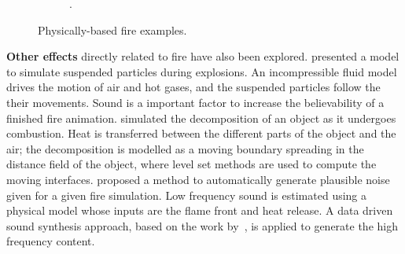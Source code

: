 \begin{figure}[htpb!]
\begin{subfigure}[t]{0.3\textwidth}
                \caption{\cite{Hong:2007}.}
        \end{subfigure} 
        \caption{Physically-based fire examples.}
        \label{fig:physically_based}
\end{figure}
 
\textbf{Other effects} directly related to fire have also been explored.
\cite{Feldman:2003} presented a model to simulate suspended particles during explosions.
An incompressible fluid model drives the motion of air and hot gases, and the suspended particles follow the their movements.
Sound is a important factor to increase the believability of a finished fire animation.
\cite{Melek:2005} simulated the decomposition of an object as it undergoes combustion.
Heat is transferred between the different parts of the object and the air; the decomposition is modelled as a moving boundary spreading in the distance field of the object, where level set methods are used to compute the moving interfaces.
\cite{Chadwick:2011} proposed a method to automatically generate plausible noise given for a given fire simulation.
Low frequency sound is estimated using a physical model whose inputs are the flame front and heat release.
A data driven sound synthesis approach, based on the work by~\cite{Wei:2000}, is applied to generate the high frequency content.

